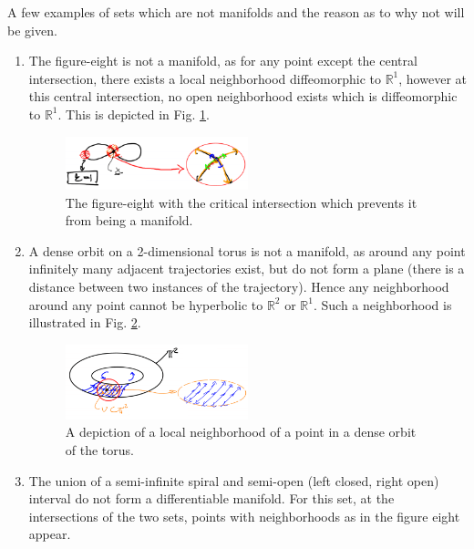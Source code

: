 \begin{ex}
	A few examples of sets which are not manifolds and the reason as to why not will be given.
	\begin{enumerate}
		\item The figure-eight is not a manifold, as for any point except the central intersection, there exists a local neighborhood diffeomorphic to $\mathbb{R}^{1}$, however at this central intersection, no open neighborhood exists which is diffeomorphic to $\mathbb{R}^{1}$. This is depicted in Fig. \ref{fig:figure_eight}.
			\begin{figure}[h!]
				\centering
				\includegraphics[width=0.5\textwidth]{figures/ch9/3b_figure_eight.png}
				\caption{The figure-eight with the critical intersection which prevents it from being a manifold.}
				\label{fig:figure_eight}
			\end{figure}
		\item A dense orbit on a 2-dimensional torus is not a manifold, as around any point infinitely many adjacent trajectories exist, but do not form a plane (there is a distance between two instances of the trajectory). Hence any neighborhood around any point cannot be hyperbolic to $\mathbb{R}^{2}$ or $\mathbb{R}^{1}$. Such a neighborhood is illustrated in Fig. \ref{fig:dense_orbit_mfd}.
			\begin{figure}[h!]
				\centering
				\includegraphics[width=0.5\textwidth]{figures/ch9/4dense_orbits_mfd.png}
				\caption{A depiction of a local neighborhood of a point in a dense orbit of the torus.}
				\label{fig:dense_orbit_mfd}
			\end{figure}
		\item The union of a semi-infinite spiral and semi-open (left closed, right open) interval do not form a differentiable manifold. For this set, at the intersections of the two sets, points with neighborhoods as in the figure eight appear.
	\end{enumerate}
\end{ex}

